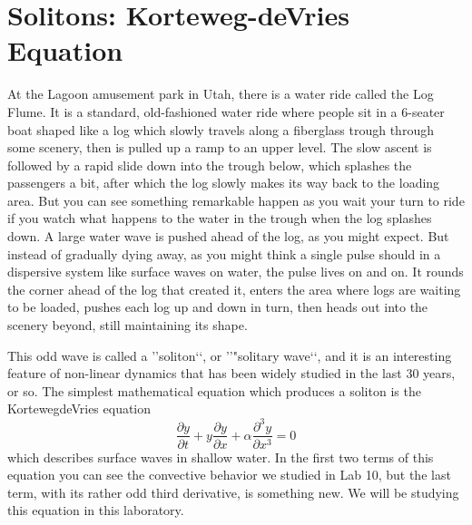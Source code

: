 
\chapter*{Solitons: Korteweg-deVries Equation}
At the Lagoon amusement park in Utah, there is a water ride called the Log Flume. It is a standard, old-fashioned water ride where people sit in a 6-seater boat shaped like a log which slowly travels along a fiberglass trough through some scenery, then is pulled up a ramp to an upper level. The slow ascent is followed by a rapid slide down into the trough below, which splashes the passengers a bit, after which the log slowly makes its way back to the loading area. But you can see something remarkable happen as you wait your turn to ride if you watch what happens to the water in the trough when the log splashes down. A large water wave is pushed ahead of the log, as you might expect. But instead of gradually dying away, as you might think a single pulse should in a dispersive system like surface waves on water, the pulse lives on and on. It rounds the corner ahead of the log that created it, enters the area where logs are waiting to be loaded, pushes each log up and down in turn, then heads out into the scenery beyond, still maintaining its shape.

This odd wave is called a \rq\rq soliton\lq\lq, or \rq\rq "solitary wave\lq\lq, and it is an interesting feature of non-linear dynamics that has been widely studied in the last 30 years, or so. The simplest mathematical equation which produces a soliton is the KortewegdeVries equation
\begin{equation}\label{eq:1201}
\frac{\partial y}{\partial t}+y \frac{\partial y}{\partial x}+\alpha \frac{\partial^{3} y}{\partial x^{3}}=0
\end{equation}
which describes surface waves in shallow water. In the first two terms of this
equation you can see the convective behavior we studied in Lab 10, but the last
term, with its rather odd third derivative, is something new. We will be studying
this equation in this laboratory.

